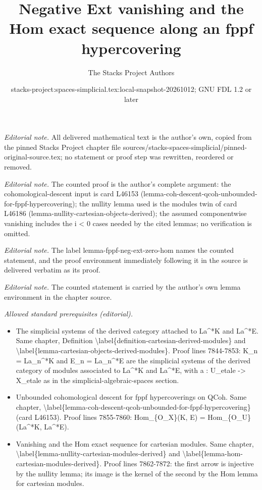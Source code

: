 \documentclass{stacks-project}
\title{Negative Ext vanishing and the Hom exact sequence along an fppf hypercovering}
\author{The Stacks Project Authors}
\date{stacks-project:spaces-simplicial.tex:local-snapshot-20261012; GNU FDL 1.2 or later}
\theoremstyle{plain}
\theoremstyle{definition}
\theoremstyle{remark}
\numberwithin{equation}{subsection}
\begin{document}
\maketitle
\noindent\textit{Editorial note.} All delivered mathematical text is the author's own, copied from the pinned Stacks Project chapter file sources/stacks-spaces-simplicial/pinned-original-source.tex; no statement or proof step was rewritten, reordered or removed.\par\medskip
\noindent\textit{Editorial note.} The counted proof is the author's complete argument: the cohomological-descent input is card L46153 (lemma-coh-descent-qcoh-unbounded-for-fppf-hypercovering); the nullity lemma used is the modules twin of card L46186 (lemma-nullity-cartesian-objects-derived); the assumed componentwise vanishing includes the i < 0 cases needed by the cited lemmas; no verification is omitted.\par\medskip
\noindent\textit{Editorial note.} The label lemma-fppf-neg-ext-zero-hom names the counted statement, and the proof environment immediately following it in the source is delivered verbatim as its proof.\par\medskip
\noindent\textit{Editorial note.} The counted statement is carried by the author's own lemma environment in the chapter source.\par\medskip
\noindent\textit{Allowed standard prerequisites (editorial).}\begin{itemize}
\item The simplicial systems of the derived category attached to La\textasciicircum{}*K and La\textasciicircum{}*E. Same chapter, Definition \textbackslash{}label\{definition-cartesian-derived-modules\} and \textbackslash{}label\{lemma-cartesian-objects-derived-modules\}. Proof lines 7844-7853: K\_n = La\_n\textasciicircum{}*K and E\_n = La\_n\textasciicircum{}*E are the simplicial systems of the derived category of modules associated to La\textasciicircum{}*K and La\textasciicircum{}*E, with a : U\_etale -> X\_etale as in the simplicial-algebraic-spaces section.
\item Unbounded cohomological descent for fppf hypercoverings on QCoh. Same chapter, \textbackslash{}label\{lemma-coh-descent-qcoh-unbounded-for-fppf-hypercovering\} (card L46153). Proof lines 7855-7860: Hom\_\{O\_X\}(K, E) = Hom\_\{O\_U\}(La\textasciicircum{}*K, La\textasciicircum{}*E).
\item Vanishing and the Hom exact sequence for cartesian modules. Same chapter, \textbackslash{}label\{lemma-nullity-cartesian-modules-derived\} and \textbackslash{}label\{lemma-hom-cartesian-modules-derived\}. Proof lines 7862-7872: the first arrow is injective by the nullity lemma; its image is the kernel of the second by the Hom lemma for cartesian modules.
\end{itemize}\medskip
\end{document}
